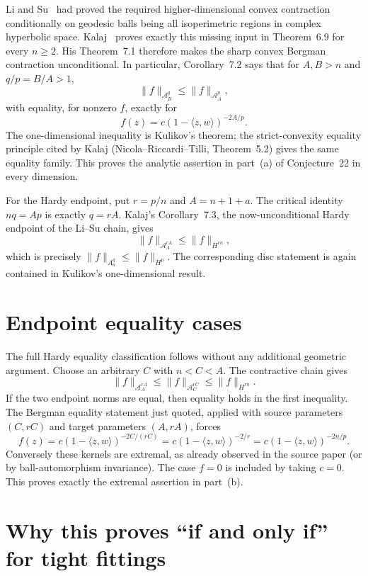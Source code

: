 \documentclass[11pt]{article}
\begin{document}
Li and Su~\cite{LiSu} had proved the required higher-dimensional convex
contraction conditionally on geodesic balls being all isoperimetric regions in
complex hyperbolic space.  Kalaj~\cite{Kalaj} proves exactly this missing input
in Theorem~6.9 for every $n\ge2$.  His Theorem~7.1 therefore makes the sharp
convex Bergman contraction unconditional.  In particular, Corollary~7.2 says
that for $A,B>n$ and $q/p=B/A>1$,
\[
 \|f\|_{\mathcal A_B^q}\le \|f\|_{\mathcal A_A^p},
\]
with equality, for nonzero $f$, exactly for
\[
 f(z)=c(1-\langle z,w\rangle)^{-2A/p}.
\]
The one-dimensional inequality is Kulikov's theorem; the strict-convexity
equality principle cited by Kalaj (Nicola--Riccardi--Tilli, Theorem~5.2) gives
the same equality family.  This proves the analytic assertion in part~(a) of
Conjecture~22 in every dimension.

For the Hardy endpoint, put $r=p/n$ and $A=n+1+a$.  The critical identity
$nq=Ap$ is exactly $q=rA$.  Kalaj's Corollary~7.3, the now-unconditional Hardy
endpoint of the Li--Su chain, gives
\[
 \|f\|_{\mathcal A_A^{rA}}\le \|f\|_{H^{rn}},
\]
which is precisely $\|f\|_{A_a^q}\le\|f\|_{H^p}$.  The corresponding disc
statement is again contained in Kulikov's one-dimensional result.

\section{Endpoint equality cases}

The full Hardy equality classification follows without any additional
geometric argument.  Choose an arbitrary $C$ with $n<C<A$.  The contractive
chain gives
\[
 \|f\|_{\mathcal A_A^{rA}}
 \le \|f\|_{\mathcal A_C^{rC}}
 \le \|f\|_{H^{rn}}.
\]
If the two endpoint norms are equal, then equality holds in the first
inequality.  The Bergman equality statement just quoted, applied with source
parameters $(C,rC)$ and target parameters $(A,rA)$, forces
\[
 f(z)=c(1-\langle z,w\rangle)^{-2C/(rC)}
     =c(1-\langle z,w\rangle)^{-2/r}
     =c(1-\langle z,w\rangle)^{-2n/p}.
\]
Conversely these kernels are extremal, as already observed in the source paper
(or by ball-automorphism invariance).  The case $f=0$ is included by taking
$c=0$.  This proves exactly the extremal assertion in part~(b).

\section{Why this proves ``if and only if'' for tight fittings}
\end{document}

